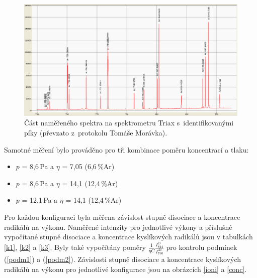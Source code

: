 \documentclass[12pt]{article}
\begin{document}
\begin{figure}[htbp]
\begin{center}
\includegraphics[width=21cm, angle=270]{triax.png}
\caption{Část naměřeného spektra na spektrometru Triax s~identifikovanými píky (převzato z~protokolu Tomáše Morávka).}
\label{tomas}
\end{center}
\end{figure}

Samotné měření bylo prováděno pro tři kombinace poměru koncentrací a tlaku:
\begin{itemize}
\item $p$ = 8,6\,Pa a $\eta$ = 7,05 (6,6\,\%Ar)
\item $p$ = 8,6\,Pa a $\eta$ = 14,1 (12,4\,\%Ar)
\item $p$ = 12,1\,Pa a $\eta$ = 14,1 (12,4\,\%Ar)
\end{itemize}
Pro každou konfiguraci byla měřena závislost stupně disociace a koncentrace radikálů na výkonu. Naměřené intenzity pro jednotlivé výkony a příslušné vypočítané stupně disociace a koncentrace kyslíkových radikálů jsou v tabulkách \ref{k1}, \ref{k2} a \ref{k3}. Byly také vypočítány poměry $\frac{1}{\eta C}\frac{I_{844}^\mathrm{O}}{I_{750}^\mathrm{Ar}}$ pro kontrolu podmínek (\ref{podm1}) a (\ref{podm2}). Závislosti stupně disociace a koncentrace kyslíkových radikálů na výkonu pro jednotlivé konfigurace jsou na obrázcích \ref{ioni} a \ref{conc}.
\end{document}
